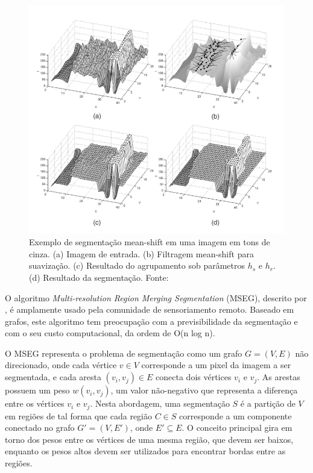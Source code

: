\begin{figure}[h]
  \centering
  \includegraphics[scale=0.5]{imgs/meanshift_exemplo}
  \caption[Exemplo de segmentação mean-shift em uma imagem em tons de cinza]{Exemplo de segmentação mean-shift em uma imagem em tons de cinza. (a) Imagem de entrada. (b) Filtragem mean-shift para suavização. (c) Resultado do agrupamento sob parâmetros $h_s$ e $h_r$. (d) Resultado da segmentação. Fonte: \cite{comaniciu:2002}}
  \label{fig:meanshift_exemplo}
\end{figure}


O algoritmo \textit{Multi-resolution Region Merging Segmentation} (MSEG), descrito por , é amplamente usado pela comunidade de sensoriamento remoto. Baseado em grafos, este algoritmo tem preocupação com a previsibilidade da segmentação e com o seu custo computacional, da ordem de O(n log n).

O MSEG representa o problema de segmentação como um grafo $G = (V,E)$ não direcionado, onde cada vértice $v \in V$ corresponde a um pixel da imagem a ser segmentada, e cada aresta $(v_i, v_j) \in E$ conecta dois vértices $v_i$ e $v_j$. As arestas possuem um peso $w(v_i, v_j)$, um valor não-negativo que representa a diferença entre os vértices $v_i$ e $v_j$. Nesta abordagem, uma segmentação $S$ é a partição de $V$ em regiões de tal forma que cada região $C \in S$ corresponde a um componente conectado no grafo $G' = (V, E')$, onde $E' \subseteq E$. O conceito principal gira em torno dos pesos entre os vértices de uma mesma região, que devem ser baixos, enquanto os pesos altos devem ser utilizados para encontrar bordas entre as regiões.

